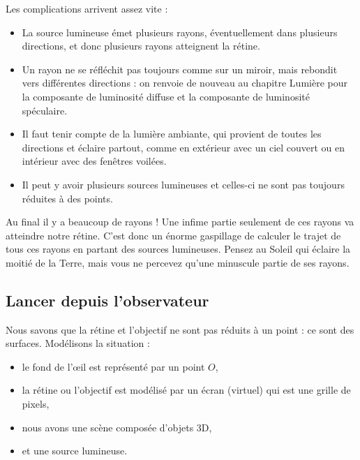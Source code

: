 \documentclass[11pt,class=report,crop=false]{standalone}
\begin{document}
Les complications arrivent assez vite :
\begin{itemize}
	\item La source lumineuse émet plusieurs rayons, éventuellement dans plusieurs directions, et donc plusieurs rayons atteignent la rétine.
	
	\item Un rayon ne se réfléchit pas toujours comme sur un miroir, mais rebondit vers différentes directions : on renvoie de nouveau au chapitre \og{}Lumière\fg{} pour la composante de luminosité diffuse et la composante de luminosité spéculaire.
	

	\item Il faut tenir compte de la lumière ambiante, qui provient de toutes les directions et éclaire partout, comme en extérieur avec un ciel couvert ou en intérieur avec des fenêtres voilées.

	\item Il peut y avoir plusieurs sources lumineuses et celles-ci ne sont pas toujours réduites à des points.
	

\end{itemize}


Au final il y a beaucoup de rayons !
Une infime partie seulement de ces rayons va atteindre notre rétine.
C'est donc un énorme gaspillage de calculer le trajet de tous ces rayons en partant des sources lumineuses.
Pensez au Soleil qui éclaire la moitié de la Terre, mais vous ne percevez qu'une minuscule partie de ses rayons.


\subsection{Lancer depuis l'observateur}

Nous savons que la rétine et l'objectif ne sont pas réduits à un point : ce sont des surfaces.
Modélisons la situation :
\begin{itemize}
  \item le fond de l'\oe il est représenté par un point $O$,
  \item la rétine ou l'objectif est modélisé par un écran (virtuel) qui est une grille de pixels,
  \item nous avons une scène composée d'objets 3D,
  \item et une source lumineuse.
\end{itemize}
\end{document}
